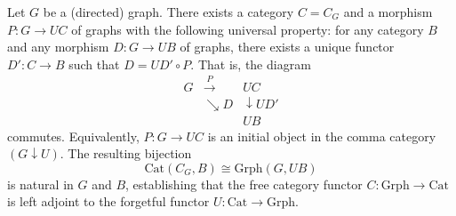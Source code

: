 Let $G$ be a (directed) graph. There exists a category $C = C_G$ and a morphism $P : G \to UC$ of graphs with the following universal property: for any category $B$ and any morphism $D : G \to UB$ of graphs, there exists a unique functor $D' : C \to B$ such that $D = UD' \circ P$. That is, the diagram
\[
\begin{array}{ccc}
G & \xrightarrow{P} & UC \\
& \searrow{D} & \downarrow{U D'} \\
& & UB
\end{array}
\]
commutes. Equivalently, $P : G \to UC$ is an initial object in the comma category $(G \downarrow U)$. The resulting bijection
$$\text{Cat}(C_G, B) \cong \text{Grph}(G, UB)$$
is natural in $G$ and $B$, establishing that the free category functor $C : \text{Grph} \to \text{Cat}$ is left adjoint to the forgetful functor $U : \text{Cat} \to \text{Grph}$.
